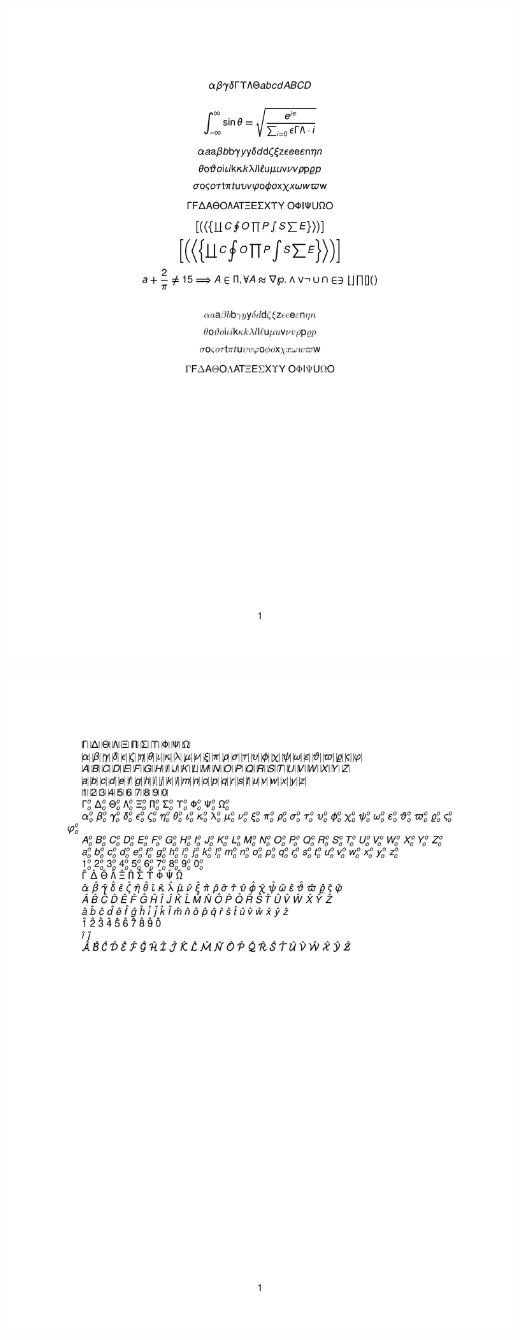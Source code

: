 \documentclass[twocolumn]{article}
\begin{document}
 \noindent\includegraphics*{../results/helvetica-font}\par
{} \noindent\includegraphics*{../results/helvetica-pos}\par
\end{document}
